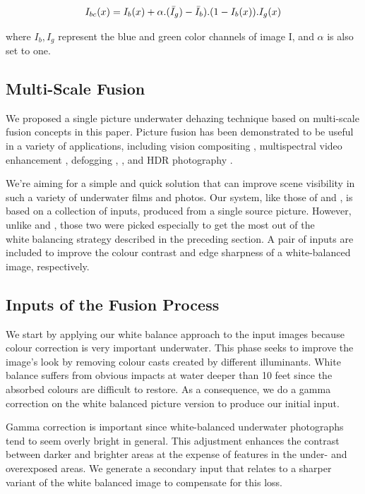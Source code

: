 \documentclass[conference]{IEEEtran}
\begin{document}
\[I_{bc}(x) = I_b(x) + \alpha.(\Bar{I}_g) - \Bar{I}_b) . (1 - I_b(x)).I_g(x)\]

where $I_b, I_g$ represent the blue and green color channels of image I, and $\alpha$ is also set to one.

\subsection{Multi-Scale Fusion}
We proposed a single picture underwater dehazing technique based on multi-scale fusion concepts in this paper. Picture fusion has been demonstrated to be useful in a variety of applications, including vision compositing \cite{bonin2011imaging}, multispectral video enhancement \cite{grundland2006cross}, defogging \cite{bennett2007multispectral}, \cite{ancuti2013single}, and HDR photography \cite{ancuti2010effective}.\\
\par
We're aiming for a simple and quick solution that can improve scene visibility in such a variety of underwater films and photos. Our system, like those of \cite{bennett2007multispectral} and \cite{ancuti2013single}, is based on a collection of inputs, produced from a single source picture. However, unlike \cite{bennett2007multispectral} and \cite{ancuti2013single}, those two were picked especially to get the most out of the whitebalancing strategy described in the preceding section. A pair of inputs are included to improve the colour contrast and edge sharpness of a white-balanced image, respectively.

\subsection{Inputs of the Fusion Process}
We start by applying our white balance approach to the input images because colour correction is very important underwater. This phase seeks to improve the image's look by removing colour casts created by different illuminants. White balance suffers from obvious impacts at water deeper than 10 feet since the absorbed colours are difficult to restore. As a consequence, we do a gamma correction on the white balanced picture version to produce our initial input.\\
\par
Gamma correction is important since white-balanced underwater photographs tend to seem overly bright in general. This adjustment enhances the contrast between darker and brighter areas at the expense of features in the under- and overexposed areas. We generate a secondary input that relates to a sharper variant of the white balanced image to compensate for this loss.
\par
\end{document}
